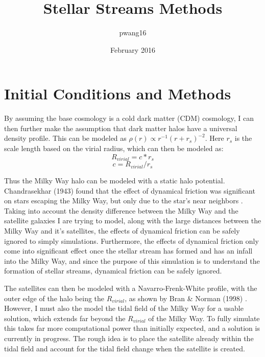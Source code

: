 \documentclass{article}
\title{Stellar Streams Methods}
\author{pwang16 }
\date{February 2016}
\begin{document}
\maketitle

\section{Initial Conditions and Methods}
By assuming the base cosmology is a cold dark matter (CDM) cosmology, I can then further make the assumption that dark matter halos have a universal density profile. This can be modeled as $\rho(r) \propto r^{-1}(r+r_s)^{-2}$. Here $r_s$ is the scale length based on the virial radius, which can then be modeled as:
\[
R_{virial} = c*r_s
\]
\[
c = R_{virial}/r_s
\]

Thus the Milky Way halo can be modeled with a static halo potential. Chandrasekhar (1943) found that the effect of dynamical friction was significant on stars escaping the Milky Way, but only due to the star's near neighbors \cite{dynamicalFriction}. Taking into account the density difference between the Milky Way and the satellite galaxies I are trying to model, along with the large distances between the Milky Way and it's satellites, the effects of dynamical friction can be safely ignored to simply simulations. Furthermore, the effects of dynamical friction only come into significant effect once the stellar stream has formed and has an infall into the Milky Way, and since the purpose of this simulation is to understand the formation of stellar streams, dynamical friction can be safely ignored. 

The satellites can then be modeled with a Navarro-Frenk-White profile, with the outer edge of the halo being the $R_{virial}$, as shown by Bran & Norman (1998) \cite{bryanNorman}. However, I must also the model the tidal field of the Milky Way for a usable solution, which extends far beyond the $R_{virial}$ of the Milky Way. To fully simulate this takes far more computational power than initially expected, and a solution is currently in progress. The rough idea is to place the satellite already within the tidal field and account for the tidal field change when the satellite is created. 
\end{document}

